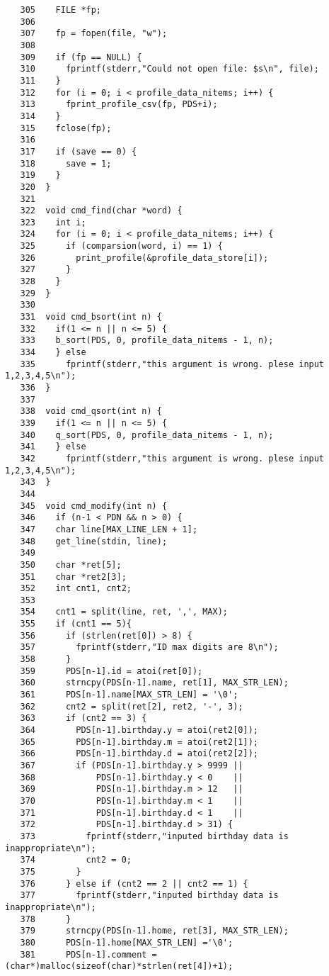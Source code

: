 \documentclass[a4paper,11pt]{jarticle}
\begin{document}
{\begin{verbatim}
   305    FILE *fp;
   306  
   307    fp = fopen(file, "w");
   308  
   309    if (fp == NULL) {
   310      fprintf(stderr,"Could not open file: $s\n", file);
   311    }
   312    for (i = 0; i < profile_data_nitems; i++) {
   313      fprint_profile_csv(fp, PDS+i);
   314    }
   315    fclose(fp);
   316  
   317    if (save == 0) {
   318      save = 1;
   319    }
   320  } 
   321  
   322  void cmd_find(char *word) {
   323    int i;
   324    for (i = 0; i < profile_data_nitems; i++) {
   325      if (comparsion(word, i) == 1) {
   326        print_profile(&profile_data_store[i]);
   327      }
   328    }
   329  } 
   330  
   331  void cmd_bsort(int n) {
   332    if(1 <= n || n <= 5) {
   333    b_sort(PDS, 0, profile_data_nitems - 1, n);
   334    } else 
   335      fprintf(stderr,"this argument is wrong. plese input 1,2,3,4,5\n");
   336  } 
   337  
   338  void cmd_qsort(int n) {
   339    if(1 <= n || n <= 5) {
   340    q_sort(PDS, 0, profile_data_nitems - 1, n);
   341    } else 
   342      fprintf(stderr,"this argument is wrong. plese input 1,2,3,4,5\n");
   343  } 
   344  
   345  void cmd_modify(int n) {
   346    if (n-1 < PDN && n > 0) {    
   347    char line[MAX_LINE_LEN + 1];
   348    get_line(stdin, line);
   349    
   350    char *ret[5];
   351    char *ret2[3];
   352    int cnt1, cnt2;
   353    
   354    cnt1 = split(line, ret, ',', MAX);
   355    if (cnt1 == 5){
   356      if (strlen(ret[0]) > 8) {
   357        fprintf(stderr,"ID max digits are 8\n");
   358      }
   359      PDS[n-1].id = atoi(ret[0]);
   360      strncpy(PDS[n-1].name, ret[1], MAX_STR_LEN);
   361      PDS[n-1].name[MAX_STR_LEN] = '\0';
   362      cnt2 = split(ret[2], ret2, '-', 3);
   363      if (cnt2 == 3) { 
   364        PDS[n-1].birthday.y = atoi(ret2[0]);
   365        PDS[n-1].birthday.m = atoi(ret2[1]);
   366        PDS[n-1].birthday.d = atoi(ret2[2]);
   367        if (PDS[n-1].birthday.y > 9999 ||
   368            PDS[n-1].birthday.y < 0    ||
   369            PDS[n-1].birthday.m > 12   ||
   370            PDS[n-1].birthday.m < 1    ||
   371            PDS[n-1].birthday.d < 1    ||
   372            PDS[n-1].birthday.d > 31) {
   373          fprintf(stderr,"inputed birthday data is inappropriate\n");
   374          cnt2 = 0;
   375        }
   376      } else if (cnt2 == 2 || cnt2 == 1) {
   377        fprintf(stderr,"inputed birthday data is inappropriate\n");
   378      } 
   379      strncpy(PDS[n-1].home, ret[3], MAX_STR_LEN);
   380      PDS[n-1].home[MAX_STR_LEN] ='\0';
   381      PDS[n-1].comment = (char*)malloc(sizeof(char)*strlen(ret[4])+1);

\end{verbatim}}
\end{document}
